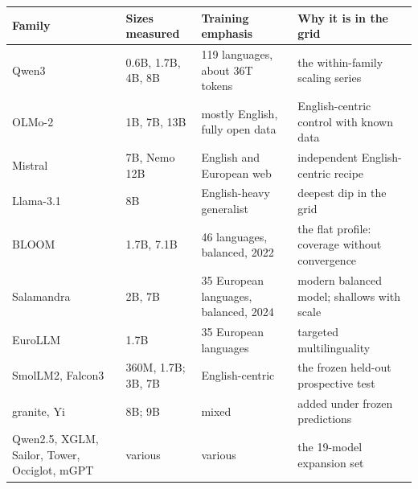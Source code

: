 \begin{center}\small
\begin{tabular}{llll}
\toprule
Family & Sizes measured & Training emphasis & Why it is in the grid \\
\midrule
Qwen3 & 0.6B, 1.7B, 4B, 8B & 119 languages, about 36T tokens & the within-family scaling series \\
OLMo-2 & 1B, 7B, 13B & mostly English, fully open data & English-centric control with known data \\
Mistral & 7B, Nemo 12B & English and European web & independent English-centric recipe \\
Llama-3.1 & 8B & English-heavy generalist & deepest dip in the grid \\
BLOOM & 1.7B, 7.1B & 46 languages, balanced, 2022 & the flat profile: coverage without convergence \\
Salamandra & 2B, 7B & 35 European languages, balanced, 2024 & modern balanced model; shallows with scale \\
EuroLLM & 1.7B & 35 European languages & targeted multilinguality \\
SmolLM2, Falcon3 & 360M, 1.7B; 3B, 7B & English-centric & the frozen held-out prospective test \\
granite, Yi & 8B; 9B & mixed & added under frozen predictions \\
Qwen2.5, XGLM, Sailor, Tower, Occiglot, mGPT & various & various & the 19-model expansion set \\
\bottomrule
\end{tabular}
\end{center}
